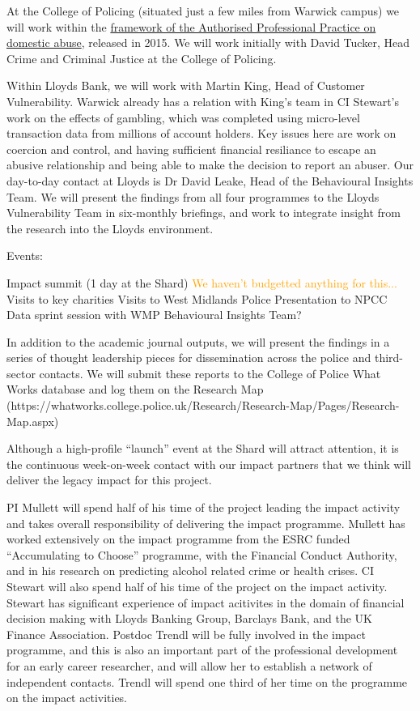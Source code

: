 \documentclass[11pt, a4paper]{article}
\newcommand{\TM}[1] {{\textcolor{orange}{#1}}}
\begin{document}
At the College of Policing (situated just a few miles from Warwick campus) we will work within the \href{https://www.app.college.police.uk/app-content/major-investigation-and-public-protection/domestic-abuse/introduction/) and the revision of the existing DASH risk assessment tool for domestic abuse. (https://whatworks.college.police.uk/Research/Documents/DA_risk_assessment_pilot.pdf}{framework of the Authorised Professional Practice on domestic abuse}, released in 2015.  
We will work initially with David Tucker, Head Crime and Criminal Justice at the College of Policing.

Within Lloyds Bank, we will work with Martin King, Head of Customer Vulnerability. Warwick already has a relation with King's team in CI Stewart's work on the effects of gambling, which was completed using micro-level transaction data from millions of account holders. Key issues here are work on coercion and control, and having sufficient financial resiliance to escape an abusive relationship and being able to make the decision to report an abuser. Our day-to-day contact at Lloyds is Dr David Leake, Head of the Behavioural Insights Team. We will present the findings from all four programmes to the Lloyds Vulnerability Team in six-monthly briefings, and work to integrate insight from the research into the Lloyds environment. 


Events:

Impact summit (1 day at the Shard) \TM{We haven't budgetted anything for this...}
Visits to key charities
Visits to West Midlands Police
Presentation to NPCC
Data sprint session with WMP Behavioural Insights Team?


In addition to the academic journal outputs, we will present the findings in a series of thought leadership pieces for dissemination across the police and third-sector contacts. We will submit these reports to the College of Police What Works database and log them on the Research Map (https://whatworks.college.police.uk/Research/Research-Map/Pages/Research-Map.aspx)

Although a high-profile ``launch'' event at the Shard will attract attention, it is the continuous week-on-week contact with our impact partners that we think will deliver the legacy impact for this project.




PI Mullett will spend half of his time of the project leading the impact activity and takes overall responsibility of delivering the impact programme. Mullett has worked extensively on the impact programme from the ESRC funded ``Accumulating to Choose'' programme, with the Financial Conduct Authority, and in his research on predicting alcohol related crime or health crises. CI Stewart will also spend half of his time of the project on the impact activity. Stewart has significant experience of impact acitivites in the domain of financial decision making with Lloyds Banking Group, Barclays Bank, and the UK Finance Association. Postdoc Trendl will be fully involved in the impact programme, and this is also an important part of the professional development for an early career researcher, and will allow her to establish a network of independent contacts. Trendl will spend one third of her time on the programme on the impact activities.
\end{document}
